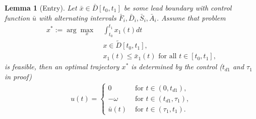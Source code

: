 \documentclass[a4paper]{article}
\theoremstyle{definition}
\theoremstyle{plain}
\newtheorem{lemma}{Lemma}
\begin{document}
\begin{lemma}[Entry]
  \label{lemma:entry}
  Let $\bar{x} \in \bar{D}[t_{0}, t_{1}]$ be some lead boundary with control
  function $\bar{u}$ with alternating intervals
  $\bar{F}_{i}, \bar{D}_{i}, \bar{S}_{i}, \bar{A}_{i}$. Assume that problem
  \begin{align*}
    x^{*} := \arg\max_{x} \; &\int_{t_{0}}^{t_{1}} x_{1}(t) dt \\
            &x \in \widetilde{D}[t_{0}, t_{1}] , \\
            &x_{1}(t) \leq \bar{x}_{1}(t)  \text{ for all } t \in [t_{0}, t_{1}] ,
  \end{align*}
  is feasible, then an optimal trajectory $x^{*}$ is determined by the control
  ($t_{d1}$ and $\tau_{1}$ in proof)
  \begin{align*}
    u(t) = \begin{cases}
             0     &\text{ for } t \in (0, t_{d1}) , \\
             -\omega    &\text{ for } t \in (t_{d1}, \tau_{1}) , \\
             \bar{u}(t) &\text{ for } t \in (\tau_{1}, t_{1}) .
            \end{cases}
  \end{align*}

\end{lemma}
\end{document}
